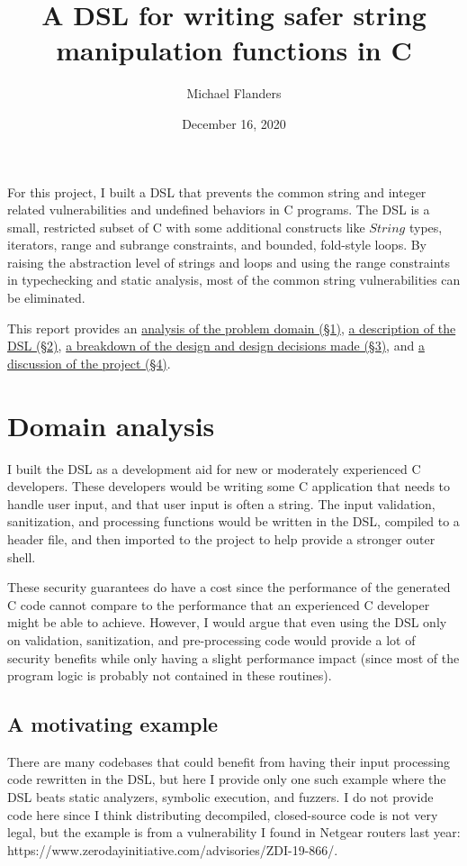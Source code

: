 \documentclass[letterpaper]{article}
\title{A DSL for writing safer string manipulation functions in C}
\author{Michael Flanders}
\date{December 16, 2020}
\begin{document}
\maketitle


For this project, I built a DSL that prevents the common string and
integer related vulnerabilities and undefined behaviors in C programs.
The DSL is a small, restricted subset of C with some additional constructs
like $String$ types, iterators, range and subrange constraints, and bounded,
fold-style loops. By raising the abstraction level of strings and loops
and using the range constraints in typechecking and static analysis,
most of the common string vulnerabilities can be eliminated.

This report provides an \hyperref[sec:domain]{analysis of the problem domain (\S1)},
\hyperref[sec:language]{a description of the DSL (\S2)},
\hyperref[sec:design]{a breakdown of the design and design decisions made (\S3)},
and \hyperref[sec:discussion]{a discussion of the project (\S4)}.

\section{Domain analysis}
\label{sec:domain}

I built the DSL as a development aid for new or moderately experienced
C developers. These developers would be writing some C application
that needs to handle user input, and that user input is often a string.
The input validation, sanitization, and processing functions would be
written in the DSL, compiled to a header file, and then imported to
the project to help provide a stronger outer shell.

These security guarantees do have a cost since the performance of the
generated C code cannot compare to the performance that an experienced
C developer might be able to achieve. However, I would argue that even
using the DSL only on validation, sanitization, and pre-processing code would
provide a lot of security benefits while only having a slight performance
impact (since most of the program logic is probably not contained in these
routines).

\subsection{A motivating example}

There are many codebases that could benefit from having their input processing
code rewritten in the DSL, but here I provide only one such example where the
DSL beats static analyzers, symbolic execution, and fuzzers. I do not
provide code here since I think distributing decompiled, closed-source code
is not very legal, but the example is from a vulnerability I found in Netgear
routers last year: https://www.zerodayinitiative.com/advisories/ZDI-19-866/.
\end{document}
